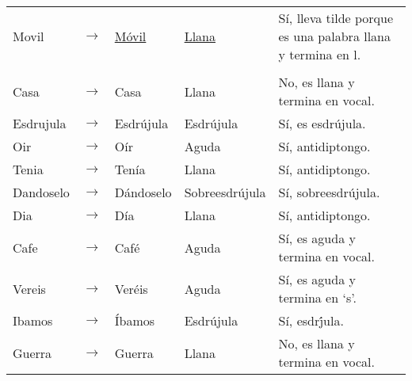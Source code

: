 \documentclass{article}
\begin{document}
	\begin{tabular}{@{}lcllp{3.25in}}
	Movil & $\rightarrow$ & \underline{Móvil} & \underline{Llana} & Sí, lleva tilde porque es una palabra llana y termina en l. \\
	& & & & \\
	Casa      & $\rightarrow$ & Casa        & Llana            & No, es llana y termina en vocal. \\
	Esdrujula & $\rightarrow$ & Esdr\'ujula & Esdr\'ujula      & S\'i, es esdr\'ujula. \\
	Oir       & $\rightarrow$ & O\'ir       & Aguda            & S\'i, antidiptongo. \\
	Tenia     & $\rightarrow$ & Ten\'ia     & Llana            & S\'i, antidiptongo. \\
	Dandoselo & $\rightarrow$ & D\'andoselo & Sobreesdr\'ujula & S\'i, sobreesdr\'ujula. \\
	Dia       & $\rightarrow$ & D\'ia       & Llana            & S\'i, antidiptongo. \\
	Cafe      & $\rightarrow$ & Caf\'e      & Aguda            & S\'i, es aguda y termina en vocal. \\
	Vereis    & $\rightarrow$ & Ver\'eis    & Aguda            & S\'i, es aguda y termina en `s'. \\
	Ibamos    & $\rightarrow$ & \'Ibamos    & Esdr\'ujula      & S\'i, esdr\'jula. \\
	Guerra    & $\rightarrow$ & Guerra      & Llana            & No, es llana y termina en vocal. \\

	\end{tabular}
\end{document}
